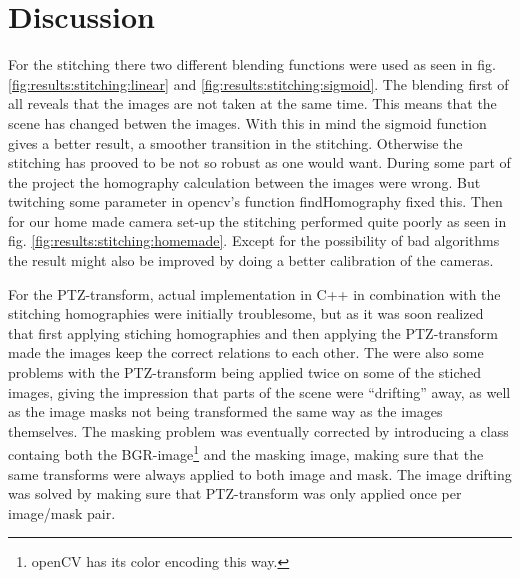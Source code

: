 \section{Discussion}
For the stitching there two different blending functions were used as seen in fig. \ref{fig:results:stitching:linear} and \ref{fig:results:stitching:sigmoid}.
The blending first of all reveals that the images are not taken at the same time.
This means that the scene has changed betwen the images.
With this in mind the sigmoid function gives a better result, a smoother transition in the stitching.
Otherwise the stitching has prooved to be not so robust as one would want.
During some part of the project the homography calculation between the images were wrong.
But twitching some parameter in opencv's function findHomography fixed this.
Then for our home made camera set-up the stitching performed quite poorly as seen in fig. \ref{fig:results:stitching:homemade}.
Except for the possibility of bad algorithms the result might also be improved by doing a better calibration of the cameras.

For the PTZ-transform, actual implementation in C++ in combination with the stitching homographies were initially troublesome, but as it was soon realized that first applying stiching homographies and then applying the PTZ-transform made the images keep the correct relations to each other.
The were also some problems with the PTZ-transform being applied twice on some of the stiched images, giving the impression that parts of the scene were ``drifting'' away, as well as the image masks not being transformed the same way as the images themselves.
The masking problem was eventually corrected by introducing a class containg both the BGR-image\footnote{openCV has its color encoding this way.} and the masking image, making sure that the same transforms were always applied to both image and mask.
The image drifting was solved by making sure that PTZ-transform was only applied once per image/mask pair.
